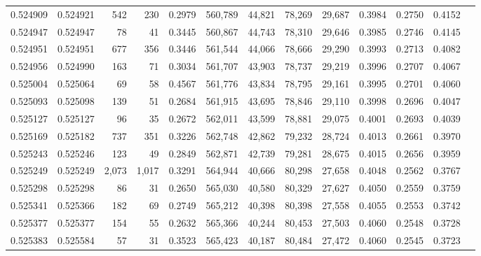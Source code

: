 \begin{tabular}{rrrrrrrrrrrrr}
0.524909 & 0.524921 &   542 &   230 &                                     0.2979 & 560,789 &  44,821 &  78,269 &  29,687 & 0.3984 & 0.2750 & 0.4152 \\
0.524947 & 0.524947 &    78 &    41 &                                     0.3445 & 560,867 &  44,743 &  78,310 &  29,646 & 0.3985 & 0.2746 & 0.4145 \\
0.524951 & 0.524951 &   677 &   356 &                                     0.3446 & 561,544 &  44,066 &  78,666 &  29,290 & 0.3993 & 0.2713 & 0.4082 \\
0.524956 & 0.524990 &   163 &    71 &                                     0.3034 & 561,707 &  43,903 &  78,737 &  29,219 & 0.3996 & 0.2707 & 0.4067 \\
0.525004 & 0.525064 &    69 &    58 &                                     0.4567 & 561,776 &  43,834 &  78,795 &  29,161 & 0.3995 & 0.2701 & 0.4060 \\
0.525093 & 0.525098 &   139 &    51 &                                     0.2684 & 561,915 &  43,695 &  78,846 &  29,110 & 0.3998 & 0.2696 & 0.4047 \\
0.525127 & 0.525127 &    96 &    35 &                                     0.2672 & 562,011 &  43,599 &  78,881 &  29,075 & 0.4001 & 0.2693 & 0.4039 \\
0.525169 & 0.525182 &   737 &   351 &                                     0.3226 & 562,748 &  42,862 &  79,232 &  28,724 & 0.4013 & 0.2661 & 0.3970 \\
0.525243 & 0.525246 &   123 &    49 &                                     0.2849 & 562,871 &  42,739 &  79,281 &  28,675 & 0.4015 & 0.2656 & 0.3959 \\
0.525249 & 0.525249 & 2,073 & 1,017 &                                     0.3291 & 564,944 &  40,666 &  80,298 &  27,658 & 0.4048 & 0.2562 & 0.3767 \\
0.525298 & 0.525298 &    86 &    31 &                                     0.2650 & 565,030 &  40,580 &  80,329 &  27,627 & 0.4050 & 0.2559 & 0.3759 \\
0.525341 & 0.525366 &   182 &    69 &                                     0.2749 & 565,212 &  40,398 &  80,398 &  27,558 & 0.4055 & 0.2553 & 0.3742 \\
0.525377 & 0.525377 &   154 &    55 &                                     0.2632 & 565,366 &  40,244 &  80,453 &  27,503 & 0.4060 & 0.2548 & 0.3728 \\
0.525383 & 0.525584 &    57 &    31 &                                     0.3523 & 565,423 &  40,187 &  80,484 &  27,472 & 0.4060 & 0.2545 & 0.3723 \\

\end{tabular}

